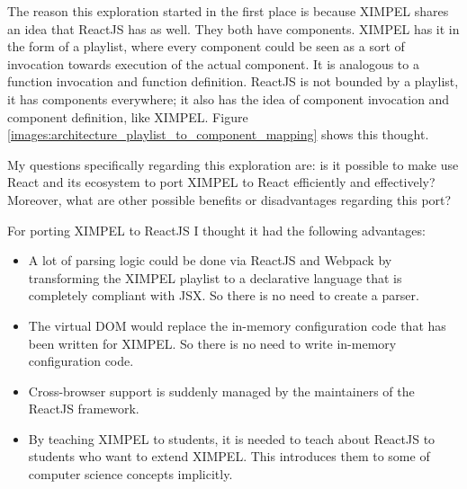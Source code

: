 The reason this exploration started in the first place is because XIMPEL shares an idea that ReactJS has as well. They both have components. XIMPEL has it in the form of a playlist, where every component could be seen as a sort of invocation towards execution of the actual component. It is analogous to a function invocation and function definition. ReactJS is not bounded by a playlist, it has components everywhere; it also has the idea of component invocation and component definition, like XIMPEL. Figure \ref{images:architecture_playlist_to_component_mapping} shows this thought.

My questions specifically regarding this exploration are: is it possible to make use React and its ecosystem to port XIMPEL to React efficiently and effectively? Moreover, what are other possible benefits or disadvantages regarding this port? 



For porting XIMPEL to ReactJS I thought it had the following advantages:
\begin{itemize}
    \item A lot of parsing logic could be done via ReactJS and Webpack by transforming the XIMPEL playlist to a declarative language that is completely compliant with JSX. So there is no need to create a parser.
    \item The virtual DOM would replace the in-memory configuration code that has been written for XIMPEL. So there is no need to write in-memory configuration code.
    \item Cross-browser support is suddenly managed by the maintainers of the ReactJS framework.
    \item By teaching XIMPEL to students, it is needed to teach about ReactJS to students who want to extend XIMPEL. This introduces them to some of computer science concepts implicitly.
\end{itemize}


